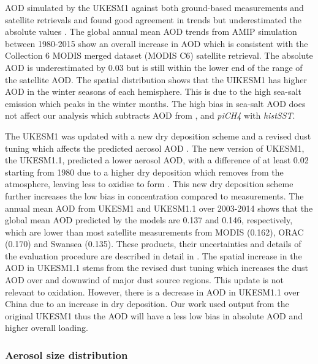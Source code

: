 AOD simulated by the UKESM1 against both ground-based measurements and satellite retrievals and found good agreement in trends but underestimated the absolute values \citep{mulcahyDescriptionEvaluationAerosol2020}. The global annual mean AOD trends from AMIP simulation between 1980-2015 show an overall increase in AOD which is consistent with the Collection 6 MODIS merged dataset (MODIS C6) satellite retrieval. The absolute AOD is underestimated by 0.03 but is still within the lower end of the range of the satellite AOD. The spatial distribution shows that the UIKESM1 has higher AOD in the winter seasons of each hemisphere. This is due to the high sea-salt emission which peaks in the winter months. The high bias in sea-salt AOD does not affect our analysis which subtracts AOD from \sstpiaer{}, \sstpio{} and \textit{piCH4} with \textit{histSST}.

The UKESM1 was updated with a new dry deposition scheme and a revised dust tuning which affects the predicted aerosol AOD \citep{mulcahyUKESM11DevelopmentEvaluation2023}. The new version of UKESM1, the UKESM1.1, predicted a lower aerosol AOD, with a difference of at least 0.02 starting from 1980 due to a higher  dry deposition which removes  from the atmosphere, leaving less to oxidise to form . This new dry deposition scheme further increases the low bias in  concentration compared to measurements. The annual mean AOD from UKESM1 and UKESM1.1 over 2003-2014 shows that the global mean AOD predicted by the models are 0.137 and 0.146, respectively, which are lower than most satellite measurements from MODIS (0.162), ORAC (0.170) and Swansea (0.135). These products, their uncertainties and details of the evaluation procedure are described in detail in \citet{mulcahyDescriptionEvaluationAerosol2020}. The spatial increase in the AOD in UKESM1.1 stems from the revised dust tuning which increases the dust AOD over and downwind of major dust source regions. This update is not relevant to  oxidation. However, there is a decrease in AOD in UKESM1.1 over China due to an increase in  dry deposition. Our work used output from the original UKESM1 thus the AOD will have a less low bias in absolute AOD and higher overall  loading.



\subsubsection{Aerosol size distribution}
\label{sec:ch3:result:aerosol-size-dist}

